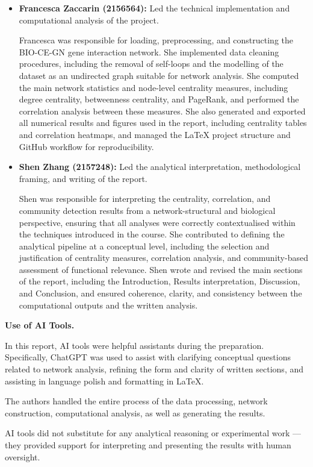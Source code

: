 \begin{itemize}
   \item \textbf{Francesca Zaccarin (2156564):} 
    Led the technical implementation and computational analysis of the project.

    Francesca was responsible for loading, preprocessing, and constructing the BIO-CE-GN gene interaction network. She implemented data cleaning procedures, including the removal of self-loops and the modelling of the dataset as an undirected graph suitable for network analysis. She computed the main network statistics and node-level centrality measures, including degree centrality, betweenness centrality, and PageRank, and performed the correlation analysis between these measures. She also generated and exported all numerical results and figures used in the report, including centrality tables and correlation heatmaps, and managed the LaTeX project structure and GitHub workflow for reproducibility.

    
    \item \textbf{Shen Zhang (2157248):} 
    Led the analytical interpretation, methodological framing, and writing of the report.

    Shen was responsible for interpreting the centrality, correlation, and community detection results from a network-structural and biological perspective, ensuring that all analyses were correctly contextualised within the techniques introduced in the course. She contributed to defining the analytical pipeline at a conceptual level, including the selection and justification of centrality measures, correlation analysis, and community-based assessment of functional relevance. Shen wrote and revised the main sections of the report, including the Introduction, Results interpretation, Discussion, and Conclusion, and ensured coherence, clarity, and consistency between the computational outputs and the written analysis.
    
\end{itemize}

\vspace{0.5cm}

\textbf{Use of AI Tools.}

In this report, AI tools were helpful assistants during the preparation. Specifically, ChatGPT was used to assist with clarifying conceptual questions related to network analysis, refining the form and clarity of written sections, and assisting in language polish and formatting in LaTeX.

The authors handled the entire process of the data processing, network construction, computational analysis, as well as generating the results.

AI tools did not substitute for any analytical reasoning or experimental work — they provided support for interpreting and presenting the results with human oversight.
